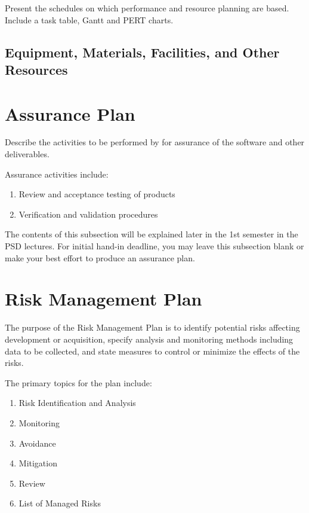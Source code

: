 \documentclass{l3deliverable}
\begin{document}
Present the schedules on which performance and resource planning are
based. Include a task table, Gantt and PERT charts.


\subsection{Equipment, Materials, Facilities, and Other Resources}


\section{Assurance Plan}

Describe the activities to be performed by for assurance of the
software and other deliverables.

Assurance activities include:
\begin{enumerate}
\item Review and acceptance testing of products
\item Verification and validation procedures
\end{enumerate}

The contents of this subsection will be explained later in the 1st
semester in the PSD lectures. For initial hand-in deadline, you may
leave this subsection blank or make your best effort to produce an
assurance plan.


\section{Risk Management Plan}

The purpose of the Risk Management Plan is to identify potential risks
affecting development or acquisition, specify analysis and monitoring
methods including data to be collected, and state measures to control
or minimize the effects of the risks.

The primary topics for the plan include:

\begin{enumerate}
\item Risk Identification and Analysis
\item Monitoring
\item Avoidance
\item Mitigation
\item Review
\item List of Managed Risks 
\end{enumerate}
\end{document}
